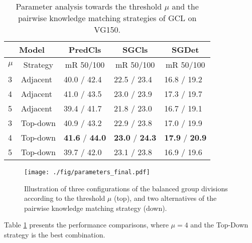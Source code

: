 \documentclass[10pt,twocolumn,letterpaper]{article}
\begin{document}
\begin{table}
	\small
	\vspace{0.4cm}
	\begin{tabular}{p{0.4cm}<{\centering}|p{1.4cm}<{\centering}|p{1.4cm}<{\centering}|p{1.4cm}<{\centering}|p{1.4cm}<{\centering}}
		\hline
		\multicolumn{2}{c|}{Model} & \multicolumn{1}{c|}{PredCls}& \multicolumn{1}{c|}{SGCls}&\multicolumn{1}{c}{SGDet}
		\\ 
		
		\hline
		\multicolumn{1}{c|}{$\mu$} & \multicolumn{1}{c|}{Strategy} & \multicolumn{1}{c|}{mR 50/100} & \multicolumn{1}{c|}{mR 50/100} & \multicolumn{1}{c}{mR 50/100} \\ \hline
		3 & Adjacent &40.0 / 42.4 & 22.5 / 23.4  & 16.8 / 19.2    \\
		4 & Adjacent &41.0 / 43.5 &23.0 / 23.9  &17.3 / 19.7   \\
		5 & Adjacent &39.4 / 41.7   & 21.8 / 23.0   & 16.7 / 19.1    \\\hline
		3 & Top-down &40.9 / 43.2   &22.9 / 23.8  &17.0 / 19.9   \\
		4 & Top-down &\textbf{41.6} / \textbf{44.0} &\textbf{23.0} / \textbf{24.3}  &\textbf{17.9} / \textbf{20.9}  \\
		5 & Top-down &39.7 / 42.0   &23.1 / 23.8  &16.9 / 19.6   \\
		 \hline
	\end{tabular}
\vspace{0.02cm}
\caption{Parameter analysis towards the threshold $\mu$ and the pairwise knowledge matching strategies of GCL on VG150.}
\vspace{-0.2cm}
\label{result_PA}
\end{table}

\begin{figure}[t]
	\centering
	\texttt{[image: ./fig/parameters\_final.pdf]}
	\vspace{-0.5cm}
	\caption{Illustration of three configurations of the balanced group divisions according to the threshold $\mu$ (top), and two alternatives of the pairwise knowledge matching strategy (down).}
	\vspace{-0.4cm}
	\label{parameters}
\end{figure}


Table \ref{result_PA} presents the performance comparisons, where $\mu=4$ and the Top-Down strategy is the best combination. 
\end{document}
